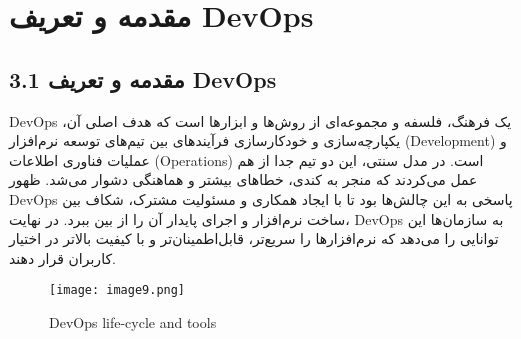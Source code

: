\section{مقدمه و تعریف DevOps}
\subsection*{3.1 مقدمه و تعریف DevOps}
DevOps یک فرهنگ، فلسفه و مجموعه‌ای از روش‌ها و ابزارها است که هدف اصلی آن، یکپارچه‌سازی و خودکارسازی فرآیندهای بین تیم‌های توسعه نرم‌افزار (Development) و عملیات فناوری اطلاعات (Operations) است. در مدل سنتی، این دو تیم جدا از هم عمل می‌کردند که منجر به کندی، خطاهای بیشتر و هماهنگی دشوار می‌شد. ظهور DevOps پاسخی به این چالش‌ها بود تا با ایجاد همکاری و مسئولیت مشترک، شکاف بین ساخت نرم‌افزار و اجرای پایدار آن را از بین ببرد. در نهایت، DevOps به سازمان‌ها این توانایی را می‌دهد که نرم‌افزارها را سریع‌تر، قابل‌اطمینان‌تر و با کیفیت بالاتر در اختیار کاربران قرار دهند.

\begin{figure}[h]
\centering
\texttt{[image: image9.png]}
\caption{DevOps life-cycle and tools}
\label{fig:DevOps life-cycle and tools}
\end{figure}

